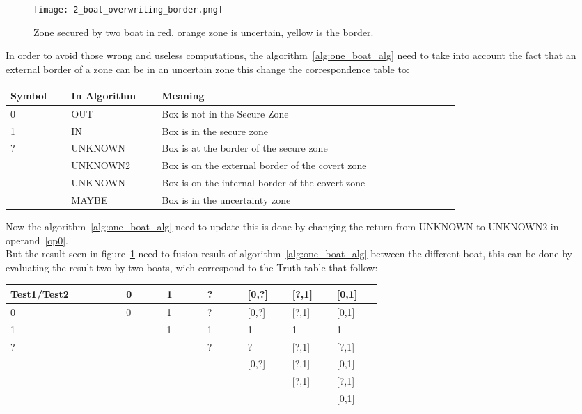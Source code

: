 \begin{figure}[H]
\centering
    \texttt{[image: 2\_boat\_overwriting\_border.png]}
    \caption{Zone secured by two boat in red, orange zone is uncertain, yellow is the border.}
    \label{fig:SecureZoneTwoBoat}
\end{figure}

In order to avoid those wrong and useless computations, the algorithm~\ref{alg:one_boat_alg} need to take into account the fact that an external border of a zone can be in an uncertain zone this change the correspondence table to:

\begin{center}
\begin{tabular}{|m{0.10\linewidth}|m{0.15\linewidth}|m{0.5\linewidth}|}
\hline
 Symbol & In Algorithm  & Meaning  \\ \hline
 0 & OUT & Box is not in the Secure Zone  \\ \hline
 1 & IN & Box is in the secure zone \\ \hline
 ? & UNKNOWN & Box is at the border of the secure zone  \\ \hline
[0,?]& UNKNOWN2  & Box is on the external border of the covert zone \\ \hline
[?,1]& UNKNOWN  & Box is on the internal border of the covert zone\\ \hline
[0,1]& MAYBE  & Box is in the uncertainty zone\\ \hline
   
\end{tabular}
\end{center}

Now the algorithm~\ref{alg:one_boat_alg} need to update this is done by changing the return from UNKNOWN to UNKNOWN2 in operand~\ref{op0}.\\
But the result seen in figure~\ref{fig:SecureZoneTwoBoat} need to fusion result of algorithm~\ref{alg:one_boat_alg} between the different boat,  this can be done by evaluating the result two by two boats, wich correspond to the Truth table that follow:

\begin{center}
\begin{tabular}{|m{0.20\linewidth}|m{0.07\linewidth}|m{0.07\linewidth}|m{0.07\linewidth}|m{0.07\linewidth}|m{0.07\linewidth}|m{0.07\linewidth}|}
\hline
Test1/Test2 & 0 & 1 & ? & [0,?] &  [?,1] & [0,1] \\ \hline
          0 & 0 & 1 & ? & [0,?] &  [?,1] & [0,1]  \\ \hline
          1 &   & 1 & 1 &   1   &    1   &   1  \\ \hline
          ? &   &   & ? &   ?   &  [?,1] & [?,1] \\ \hline
      [0,?] &   &   &   & [0,?] &  [?,1] & [0,1] \\ \hline
      [?,1] &   &   &   &       &  [?,1] & [?,1] \\ \hline
      [0,1] &   &   &   &       &        & [0,1]  \\ \hline   
\end{tabular}
\end{center}

